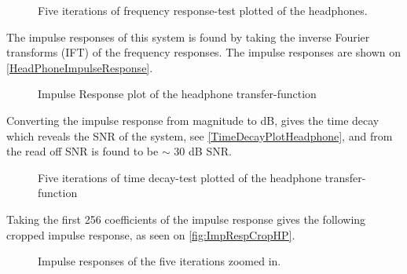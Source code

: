 \begin{figure}[H]
	\centering
	
	\caption{Five iterations of frequency response-test plotted of the headphones.}
	\label{HeadPhoneFrequencyResponsePlot}
\end{figure}



The impulse responses of this system is found by taking the inverse Fourier transforms (IFT) of the frequency responses.
The impulse responses are shown on \autoref{HeadPhoneImpulseResponse}.


\begin{figure}[H]
	\centering
	
	\caption{Impulse Response plot of the headphone transfer-function }
	\label{HeadPhoneImpulseResponse}
\end{figure}

%	

Converting the impulse response from magnitude to dB, gives the time decay which reveals the SNR  of the system, see \autoref{TimeDecayPlotHeadphone}, and from the read off SNR is found to be $\sim$ 30 dB SNR. 

\begin{figure}[H]
	\centering
	
	\caption{Five iterations of time decay-test plotted of the headphone transfer-function}
	\label{TimeDecayPlotHeadphone}
\end{figure}

Taking the first 256 coefficients of the impulse response gives the following cropped impulse response, as seen on \autoref{fig:ImpRespCropHP}.

\begin{figure}[H]
	\centering
	
	\caption{Impulse responses of the five iterations zoomed in.}
	\label{fig:ImpRespCropHP}
\end{figure}

